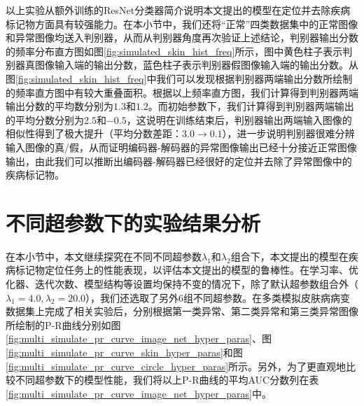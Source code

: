 以上实验从额外训练的ResNet分类器简介说明本文提出的模型在定位并去除疾病标记物方面具有较强能力。在本小节中，我们还将“正常”四类数据集中的正常图像和异常图像均送入判别器，从而从判别器角度再次验证上述结论，判别器输出分数的频率分布直方图如图\ref{fig:simulated_skin_hist_freq}所示，图中黄色柱子表示判别器真图像输入端的输出分数，蓝色柱子表示判别器假图像输入端的输出分数。从图\ref{fig:simulated_skin_hist_freq}中我们可以发现根据判别器两端输出分数所绘制的频率直方图中有较大重叠面积。根据以上频率直方图，我们计算得到判别器两端输出分数的平均数分别为$1.3 $和$1.2$。而初始参数下，我们计算得到判别器两端输出的平均分数分别为$2.5$和$-0.5$，这说明在训练结束后，判别器输出两端输入图像的相似性得到了极大提升（平均分数差距：$3.0\rightarrow 0.1$），进一步说明判别器很难分辨输入图像的真/假，从而证明编码器-解码器的异常图像输出已经十分接近正常图像输出，由此我们可以推断出编码器-解码器已经很好的定位并去除了异常图像中的疾病标记物。
\section{不同超参数下的实验结果分析}\label{sec:multi_classes_hyper_paras}
在本小节中，本文继续探究在不同不同超参数$\lambda_{1}$和$\lambda_{2}$组合下，本文提出的模型在疾病标记物定位任务上的性能表现，以评估本文提出的模型的鲁棒性。在学习率、优化器、迭代次数、模型结构等设置均保持不变的情况下，除了默认超参数组合外（$\lambda_{1}=4.0,\lambda_{2}=20.0$），我们还选取了另外$6$组不同超参数。在多类模拟皮肤病病变数据集上完成了相关实验后，分别根据第一类异常、第二类异常和第三类异常图像所绘制的P-R曲线分别如图\ref{fig:multi_simulate_pr_curve_image_net_hyper_paras}、图\ref{fig:multi_simulate_pr_curve_skin_hyper_paras}和图\ref{fig:multi_simulate_pr_curve_circle_hyper_paras}所示。另外，为了更直观地比较不同超参数下的模型性能，我们将以上P-R曲线的平均AUC分数列在表\ref{fig:multi_simulate_pr_curve_image_net_hyper_paras}中。

